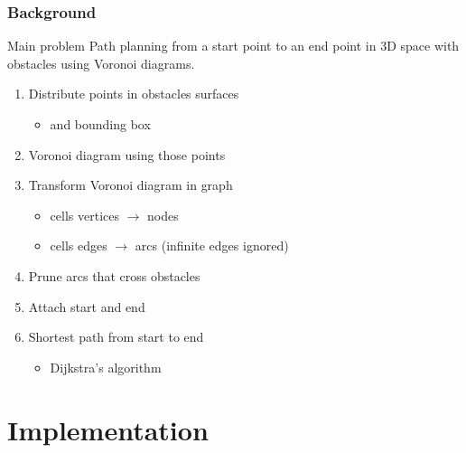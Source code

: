 \begin{frame}
  \frametitle{Background}
  \begin{block}{Main problem}
    \alert{Path planning} from a \alert{start} point to an \alert{end}
    point in 3D space with obstacles using \alert{Voronoi} diagrams.
  \end{block}\pause
  \begin{enumerate}
  \item Distribute \alert{points} in obstacles surfaces
    \begin{itemize}
    \item and bounding box\pause
    \end{itemize}
  \item \alert{Voronoi} diagram using those points\pause
  \item Transform Voronoi diagram in \alert{graph}
    \begin{itemize}
    \item cells \alert{vertices} $\rightarrow$ \alert{nodes}
    \item cells \alert{edges} $\rightarrow$ \alert{arcs} (infinite edges
      ignored)\pause
    \end{itemize}
  \item \alert{Prune} arcs that cross obstacles\pause
  \item Attach \alert{start} and \alert{end}\pause
  \item Shortest path from start to end
    \begin{itemize}
    \item \alert{Dijkstra}'s algorithm
    \end{itemize}
  \end{enumerate}
\end{frame}


\section{Implementation}

